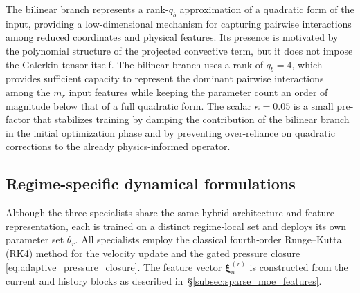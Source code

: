 The bilinear branch represents a rank-$q_b$
approximation of a quadratic form of the input, providing a low-dimensional mechanism for capturing pairwise interactions among reduced coordinates and physical features. Its presence is motivated by the polynomial structure of the projected convective term, but it does not impose the Galerkin tensor itself. The bilinear branch uses a rank of $q_b=4$, which provides sufficient
capacity to represent the dominant pairwise interactions among the
$m_r$ input features while keeping the parameter count an order of
magnitude below that of a full quadratic form.
The scalar $\kappa=0.05$ is a small pre-factor that stabilizes training
by damping the contribution of the bilinear branch in the initial
optimization phase and by preventing over-reliance on quadratic
corrections to the already physics-informed operator.


\subsection{Regime-specific dynamical formulations}
\label{subsec:regime_specific_contracts}

Although the three specialists share the same hybrid architecture and
feature representation, each is trained on a distinct regime‑local
set and deploys its own parameter set $\theta_r$.  All specialists
employ the classical fourth‑order Runge–Kutta (RK4) method for the
velocity update and the gated pressure closure
\eqref{eq:adaptive_pressure_closure}.  The feature vector
$\boldsymbol{\xi}^{(r)}_n$ is constructed from the current and history
blocks as described in~\S\ref{subsec:sparse_moe_features}.

